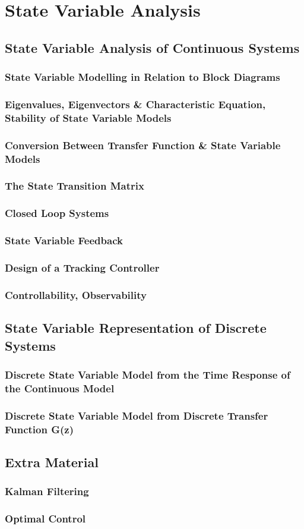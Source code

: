 \chapter{State Variable Analysis}

\newpage
\section{State Variable Analysis of Continuous Systems}
\subsection{State Variable Modelling in Relation to Block Diagrams}
\subsection{Eigenvalues, Eigenvectors \& Characteristic Equation, Stability of State Variable Models}
\subsection{Conversion Between Transfer Function \& State Variable Models}
\subsection{The State Transition Matrix}
\subsection{Closed Loop Systems}
\subsection{State Variable Feedback}
\subsection{Design of a Tracking Controller}
\subsection{Controllability, Observability}

\newpage
\section{State Variable Representation of Discrete Systems}
\subsection{Discrete State Variable Model from the Time Response of the Continuous Model}
\subsection{Discrete State Variable Model from Discrete Transfer Function G(z)}

\newpage
\section{Extra Material}
\subsection{Kalman Filtering}
\subsection{Optimal Control}

